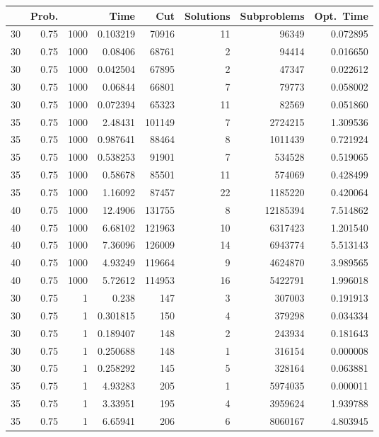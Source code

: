 \documentclass[a4paper,11pt]{article}
\begin{document}
\begin{table}
\begin{center}
\begin{tabular}{|rrr|r|r|rr|r|}
\hline
 & Prob. &  & Time & Cut & Solutions & Subproblems & Opt.\ Time \\
\hline
30 & 0.75 & 1000 & 0.103219 & 70916 & 11 & 96349 & 0.072895 \\
30 & 0.75 & 1000 & 0.08406 & 68761 & 2 & 94414 & 0.016650 \\
30 & 0.75 & 1000 & 0.042504 & 67895 & 2 & 47347 & 0.022612 \\
30 & 0.75 & 1000 & 0.06844 & 66801 & 7 & 79773 & 0.058002 \\
30 & 0.75 & 1000 & 0.072394 & 65323 & 11 & 82569 & 0.051860 \\
35 & 0.75 & 1000 & 2.48431 & 101149 & 7 & 2724215 & 1.309536 \\
35 & 0.75 & 1000 & 0.987641 & 88464 & 8 & 1011439 & 0.721924 \\
35 & 0.75 & 1000 & 0.538253 & 91901 & 7 & 534528 & 0.519065 \\
35 & 0.75 & 1000 & 0.58678 & 85501 & 11 & 574069 & 0.428499 \\
35 & 0.75 & 1000 & 1.16092 & 87457 & 22 & 1185220 & 0.420064 \\
40 & 0.75 & 1000 & 12.4906 & 131755 & 8 & 12185394 & 7.514862 \\
40 & 0.75 & 1000 & 6.68102 & 121963 & 10 & 6317423 & 1.201540 \\
40 & 0.75 & 1000 & 7.36096 & 126009 & 14 & 6943774 & 5.513143 \\
40 & 0.75 & 1000 & 4.93249 & 119664 & 9 & 4624870 & 3.989565 \\
40 & 0.75 & 1000 & 5.72612 & 114953 & 16 & 5422791 & 1.996018 \\
\hline
30 & 0.75 & 1 & 0.238 & 147 & 3 & 307003 & 0.191913 \\
30 & 0.75 & 1 & 0.301815 & 150 & 4 & 379298 & 0.034334 \\
30 & 0.75 & 1 & 0.189407 & 148 & 2 & 243934 & 0.181643 \\
30 & 0.75 & 1 & 0.250688 & 148 & 1 & 316154 & 0.000008 \\
30 & 0.75 & 1 & 0.258292 & 145 & 5 & 328164 & 0.063881 \\
35 & 0.75 & 1 & 4.93283 & 205 & 1 & 5974035 & 0.000011 \\
35 & 0.75 & 1 & 3.33951 & 195 & 4 & 3959624 & 1.939788 \\
35 & 0.75 & 1 & 6.65941 & 206 & 6 & 8060167 & 4.803945 \\

\end{tabular}
\end{center}
\end{table}
\end{document}
